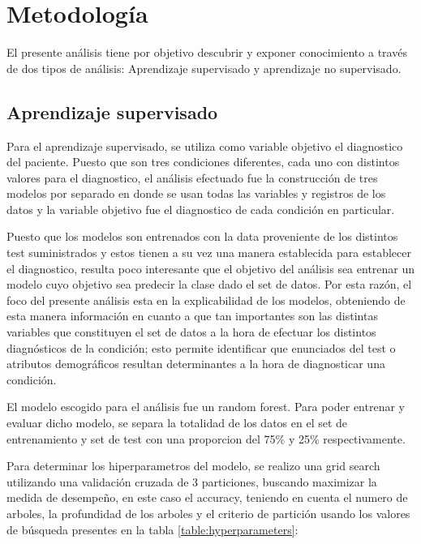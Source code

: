 \section{Metodología}

El presente análisis tiene por objetivo descubrir y exponer conocimiento a través de dos tipos de análisis: Aprendizaje supervisado y aprendizaje no supervisado.

\subsection{Aprendizaje supervisado}
Para el aprendizaje supervisado, se utiliza como variable objetivo el diagnostico del paciente. Puesto que son tres condiciones diferentes, cada uno con distintos valores para el diagnostico, el análisis efectuado fue la construcción de tres modelos por separado en donde se usan todas las variables y registros de los datos y la variable objetivo fue el diagnostico de cada condición en particular. 
 \medbreak
 
 Puesto que los modelos son entrenados con la data proveniente de los distintos test suministrados y estos tienen a su vez una manera establecida para establecer el diagnostico, resulta poco interesante que el objetivo del análisis sea entrenar un modelo cuyo objetivo sea predecir la clase dado el set de datos. Por esta razón, el foco del presente análisis esta en la explicabilidad de los modelos, obteniendo de esta manera información en cuanto a que tan importantes son las distintas variables que constituyen el set de datos a la hora de efectuar los distintos diagnósticos de la condición; esto permite identificar que enunciados del test o atributos demográficos resultan determinantes a la hora de diagnosticar una condición.
 
 \medbreak
 
 El modelo escogido para el análisis fue un random forest. Para poder entrenar y evaluar dicho modelo, se separa la totalidad de los datos en el set de entrenamiento y set de test con una proporcion del 75\% y 25\% respectivamente.
 
  \medbreak
  
 Para determinar los hiperparametros del modelo, se realizo  una grid search utilizando una validación cruzada de 3 particiones, buscando maximizar la medida de desempeño, en este caso el accuracy, teniendo en cuenta el numero de arboles, la profundidad de los arboles y el criterio de partición usando los valores de búsqueda presentes en la tabla \ref{table:hyperparameters}:
 
